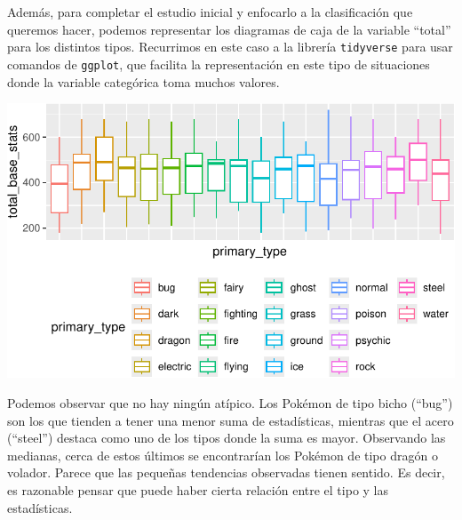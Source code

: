 \documentclass[
  12pt,
]{extreport}
\begin{document}
Además, para completar el estudio inicial y enfocarlo a la clasificación
que queremos hacer, podemos representar los diagramas de caja de la
variable ``total'' para los distintos tipos. Recurrimos en este caso a
la librería \texttt{tidyverse} para usar comandos de \texttt{ggplot},
que facilita la representación en este tipo de situaciones donde la
variable categórica toma muchos valores.

\includegraphics{trabajo_files/figure-pdf/unnamed-chunk-62-1.pdf}

Podemos observar que no hay ningún atípico. Los Pokémon de tipo bicho
(``bug'') son los que tienden a tener una menor suma de estadísticas,
mientras que el acero (``steel'') destaca como uno de los tipos donde la
suma es mayor. Observando las medianas, cerca de estos últimos se
encontrarían los Pokémon de tipo dragón o volador. Parece que las
pequeñas tendencias observadas tienen sentido. Es decir, es razonable
pensar que puede haber cierta relación entre el tipo y las estadísticas.
\end{document}
